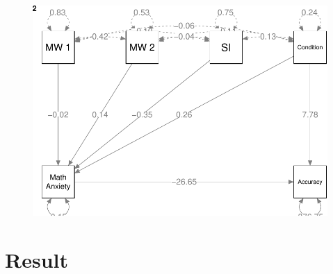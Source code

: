 \documentclass[
  letterpaper,
  DIV=11,
  numbers=noendperiod]{scrartcl}
\begin{document}
\begin{figure}[H]

{\centering \includegraphics{sampling_files/figure-pdf/unnamed-chunk-41-4.pdf}

}

\end{figure}

\hypertarget{result}{%
\section{Result}\label{result}}
\end{document}
